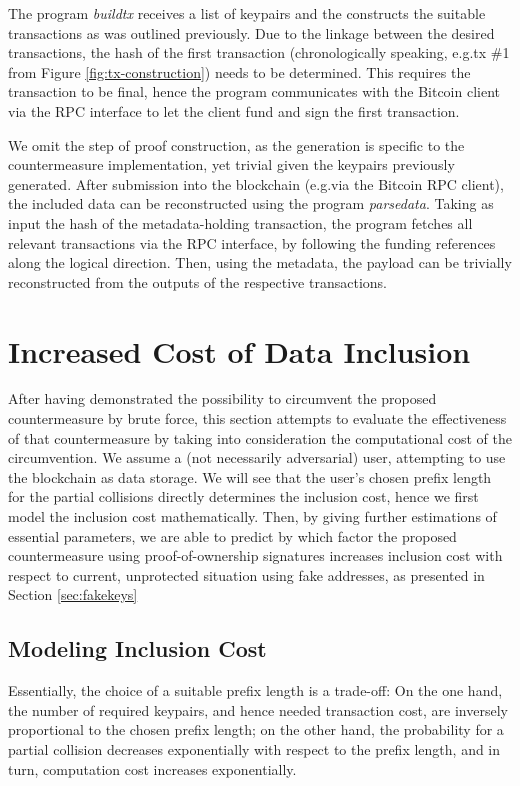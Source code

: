 \documentclass[a4paper,11pt,titlepage]{scrbook}
\begin{document}
The program \emph{buildtx} receives a list of keypairs and the constructs the suitable transactions as was outlined previously.
Due to the linkage between the desired transactions, the hash of the first transaction (chronologically speaking, e.g.\@ tx \#1 from Figure \ref{fig:tx-construction}) needs to be determined.
This requires the transaction to be final, hence the program communicates with the Bitcoin client via the RPC interface to let the client fund and sign the first transaction.

We omit the step of proof construction, as the generation is specific to the countermeasure implementation, yet trivial given the keypairs previously generated.
After submission into the blockchain (e.g.\@ via the Bitcoin RPC client), the included data can be reconstructed using the program \emph{parsedata}.
Taking as input the hash of the metadata-holding transaction, the program fetches all relevant transactions via the RPC interface, by following the funding references along the logical direction.
Then, using the metadata, the payload can be trivially reconstructed from the outputs of the respective transactions.


\chapter{Increased Cost of Data Inclusion}\label{chap:evaluation}

After having demonstrated the possibility to circumvent the proposed countermeasure by brute force, this section attempts to evaluate the effectiveness of that countermeasure by taking into consideration the computational cost of the circumvention. 
We assume a (not necessarily adversarial) user, attempting to use the blockchain as data storage.
We will see that the user's chosen prefix length for the partial collisions directly determines the inclusion cost, hence we first model the inclusion cost mathematically. Then, by giving further estimations of essential parameters, we are able to predict by which factor the proposed countermeasure using proof-of-ownership signatures increases inclusion cost with respect to current, unprotected situation using fake addresses, as presented in Section \ref{sec:fakekeys}

\section{Modeling Inclusion Cost}

Essentially, the choice of a suitable prefix length is a trade-off:
On the one hand, the number of required keypairs, and hence needed transaction cost, are inversely proportional to the chosen prefix length;
on the other hand, the probability for a partial collision decreases exponentially with respect to the prefix length, and in turn, computation cost increases exponentially.
\end{document}
